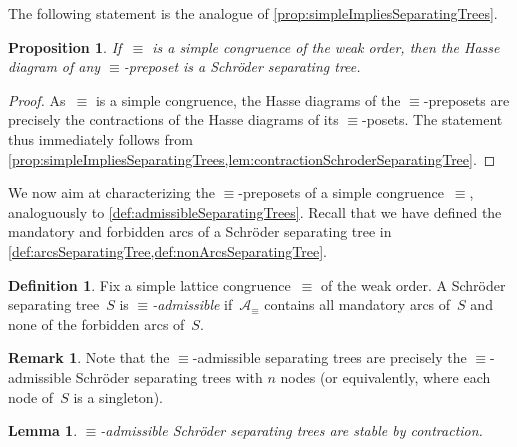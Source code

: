 \documentclass{amsart}
\newtheorem{proposition}[theorem]{Proposition}
\newtheorem{lemma}[theorem]{Lemma}
\theoremstyle{definition}
\newtheorem{definition}[theorem]{Definition}
\newtheorem{remark}[theorem]{Remark}
\newcommand{\darkblue}{\color{darkblue}} %
\newcommand{\defn}[1]{\textsl{\darkblue #1}} %
\newcommand{\arcs}{{\mathcal{A}}} %
\begin{document}
The following statement is the analogue of \cref{prop:simpleImpliesSeparatingTrees}.

\begin{proposition}
\label{prop:simpleImpliesSchroderSeparatingTrees}
If~$\equiv$ is a simple congruence of the weak order, then the Hasse diagram of any $\equiv$-preposet is a Schröder separating tree.
\end{proposition}

\begin{proof}
As~$\equiv$ is a simple congruence, the Hasse diagrams of the $\equiv$-preposets are precisely the contractions of the Hasse diagrams of its $\equiv$-posets.
The statement thus immediately follows from \cref{prop:simpleImpliesSeparatingTrees,lem:contractionSchroderSeparatingTree}.
\end{proof}

We now aim at characterizing the $\equiv$-preposets of a simple congruence~$\equiv$, analoguously to \cref{def:admissibleSeparatingTrees}.
Recall that we have defined the mandatory and forbidden arcs of a Schröder separating tree in \cref{def:arcsSeparatingTree,def:nonArcsSeparatingTree}.

\begin{definition}
\label{def:admissibleSchroderSeparatingTrees}
Fix a simple lattice congruence~$\equiv$ of the weak order.
A Schröder separating tree~$S$ is \defn{$\equiv$-admissible} if~$\arcs_\equiv$ contains all mandatory arcs of~$S$ and none of the forbidden arcs of~$S$.
\end{definition}

\begin{remark}
Note that the $\equiv$-admissible separating trees are precisely the $\equiv$-admissible Schröder separating trees with $n$ nodes (or equivalently, where each node of~$S$ is a singleton).
\end{remark}

\begin{lemma}
\label{lem:contractionAdmissibleSchroderSeparatingTree}
$\equiv$-admissible Schröder separating trees are stable by contraction.
\end{lemma}
\end{document}
